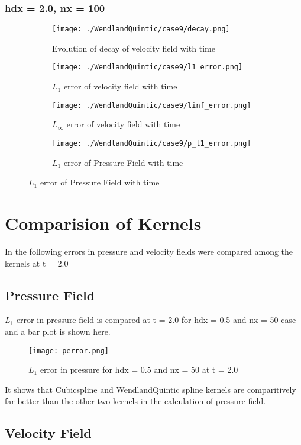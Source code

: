 \documentclass[11pt, a4paper]{article}
\begin{document}
\subsubsection{hdx = 2.0, nx = 100}
\begin{figure}[H]
\begin{subfigure}{0.48\textwidth}
\texttt{[image: ./WendlandQuintic/case9/decay.png]}
\caption{Evolution of decay of velocity field with time}
\end{subfigure}
\begin{subfigure}{0.48\textwidth}
\texttt{[image: ./WendlandQuintic/case9/l1\_error.png]}
\caption{$L_1$ error of velocity field with time}
\end{subfigure}
\medskip
\begin{subfigure}{0.48\textwidth}
\texttt{[image: ./WendlandQuintic/case9/linf\_error.png]}
\caption{$L_\infty$ error of velocity field with time}
\end{subfigure}
\begin{subfigure}{0.48\textwidth}
\texttt{[image: ./WendlandQuintic/case9/p\_l1\_error.png]}
\caption{$L_1$ error of Pressure Field with time}
\end{subfigure}
\end{figure}

\section{Comparision of Kernels}
In the following errors in pressure and velocity fields were compared among the kernels at t = 2.0
\subsection{Pressure Field}
$L_1$ error in pressure field is compared at t = 2.0 for hdx = 0.5 and nx = 50 case and a bar plot is shown here.
\begin{figure}[H]
 \centering
 \texttt{[image: perror.png]}
 \caption{$L_1$ error in pressure for hdx = 0.5 and nx = 50 at t = 2.0}
\end{figure}
It shows that Cubicspline and WendlandQuintic spline kernels are comparitively far better than the other two kernels in the calculation of pressure field.

\subsection{Velocity Field}
\end{document}
